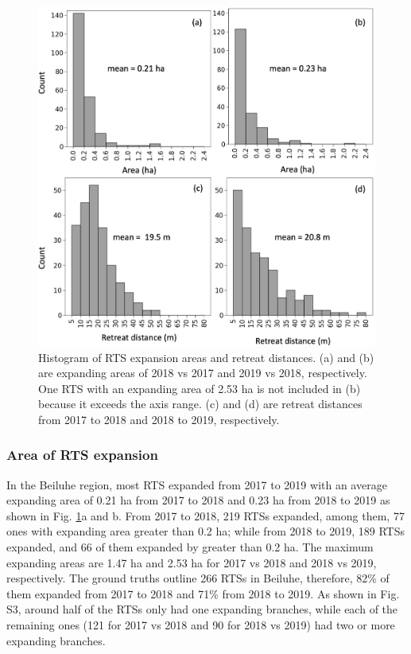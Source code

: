 \documentclass[authoryear,preprint,review,12pt]{elsarticle}
\begin{document}
\begin{figure} 
	\centering
	\includegraphics[width=14cm]{figs/rts_change_area_dis_manu_trim.jpg}
	\caption{Histogram of RTS expansion areas and retreat distances. (a) and (b) are expanding areas of 2018 vs 2017 and 2019 vs 2018, respectively. One RTS with an expanding area of 2.53 ha is not included in (b) because it exceeds the axis range. (c) and (d) are retreat distances from 2017 to 2018 and 2018 to 2019, respectively.}
	\label{fig_rts_change_area_reDis}
\end{figure}

\subsubsection{Area of RTS expansion}
\label{sec_rts_change_area}


In the Beiluhe region, most RTS expanded from 2017 to 2019 with an average expanding area of 0.21 ha from 2017 to 2018 and 0.23 ha from 2018 to 2019 as shown in Fig. \ref{fig_rts_change_area_reDis}a and b.
From 2017 to 2018, 219 RTSs expanded, among them, 77 ones with expanding area greater than 0.2 ha; while from 2018 to 2019, 189 RTSs expanded, and 66 of them expanded by greater than 0.2 ha.
The maximum expanding areas are 1.47 ha and 2.53 ha for 2017 vs 2018 and 2018 vs 2019, respectively. 
The ground truths outline 266 RTSs in Beiluhe, therefore, 82\% of them expanded from 2017 to 2018 and 71\% from 2018 to 2019. 
As shown in Fig. S3, around half of the RTSs only had one expanding branches, while each of the remaining ones (121 for 2017 vs 2018 and 90 for 2018 vs 2019)  had two or more expanding branches. 
\end{document}
